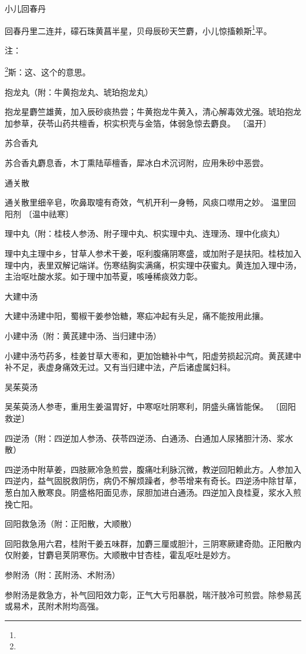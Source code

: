 \documentclass[a4paper,12pt,UTF8,twoside]{ctexbook}
\begin{document}
小儿回春丹

回春丹里二连并，礞石珠黄菖半星，贝母辰砂天竺麝，小儿惊搐赖斯\footnote{}平。

注：

\footnote{}斯：这、这个的意思。

抱龙丸（附：牛黄抱龙丸、琥珀抱龙丸）

抱龙星麝竺雄黄，加入辰砂痰热尝；牛黄抱龙牛黄入，清心解毒效尤强。琥珀抱龙加参草，茯苓山药共檀香，枳实枳壳与金箔，体弱急惊去麝良。
〔温开〕

苏合香丸

苏合香丸麝息香，木丁熏陆荜檀香，犀冰白术沉诃附，应用朱砂中恶尝。

通关散

通关散里细辛皂，吹鼻取嚏有奇效，气机开利一身畅，风痰口噤用之妙。
温里回阳剂
〔温中祛寒〕

理中丸（附：桂枝人参汤、附子理中丸、枳实理中丸、连理汤、理中化痰丸）

理中丸主理中乡，甘草人参术干姜，呕利腹痛阴寒盛，或加附子是扶阳。桂枝加入理中内，表里双解记端详。伤寒结胸实满痛，枳实理中茯蜜丸。黄连加入理中汤，主治呕吐酸水浆。如于理中加苓夏，咳唾稀痰效力彰。

大建中汤

大建中汤建中阳，蜀椒干姜参饴糖，寒疝冲起有头足，痛不能按用此攘。

小建中汤（附：黄芪建中汤、当归建中汤）

小建中汤芍药多，桂姜甘草大枣和，更加饴糖补中气，阳虚劳损起沉疴。黄芪建中补不足，表虚身痛效无过。又有当归建中法，产后诸虚属妇科。

吴茱萸汤

吴茱萸汤人参枣，重用生姜温胃好，中寒呕吐阴寒利，阴盛头痛皆能保。
〔回阳救逆〕

四逆汤（附：四逆加人参汤、茯苓四逆汤、白通汤、白通加人尿猪胆汁汤、浆水散）

四逆汤中附草姜，四肢厥冷急煎尝，腹痛吐利脉沉微，教逆回阳赖此方。人参加入四逆内，益气固脱救阴伤，病仍不解烦躁者，参苓增来有奇长。四逆汤中除甘草，葱白加入散寒良。阴盛格阳面见赤，尿胆加进白通汤。四逆加入良桂夏，浆水入煎挽亡阳。

回阳救急汤（附：正阳散，大顺散）

回阳救急用六君，桂附干姜五味群，加麝三厘或胆汁，三阴寒厥建奇勋。正阳散内仅附姜，甘麝皂荚阴寒伤。大顺散中甘杏桂，霍乱呕吐是妙方。

参附汤（附：芪附汤、术附汤）

参附汤是救急方，补气回阳效力彰，正气大亏阳暴脱，喘汗肢冷可煎尝。除参易芪或易术，芪附术附均高强。
\end{document}
